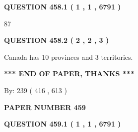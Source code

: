 \documentclass[12pt]{article}
\begin{document}
{\textbf{\Large{QUESTION
458.1 
 ( 1 , 1 , 6791 )
}}}
  
  
 
 
\noindent{}

87
 
 
  
\vspace{0.2in}
  
{\textbf{\Large{QUESTION
458.2 
 ( 2 , 2 , 3 )
}}}
  
  
 
 
\noindent{}
 
 
Canada has 10  provinces and 3 territories.
 
 
 
 
   
   
 \vspace{0.2in}
 
   
   
   
   
\vspace{1.0in} 
{\textbf{\large{ *** END OF PAPER, THANKS *** }}} 
   
   
\hspace{1.0in} By: 
 239 ( 416 ,  613 )
   
   
   
   
\newpage 
\setcounter{page}{ 
   459001 } 
   
   
   
   
 {\textbf{ \Large{ PAPER NUMBER  459  }}}
   
   
\vspace{0.2in}
   
   
   
   
   
   
 \vspace{0.2in}
 
 
 
 
   
   
  
\vspace{0.2in}
  
{\textbf{\Large{QUESTION
459.1 
 ( 1 , 1 , 6791 )
}}}
  
  
 
 
\noindent{}
\end{document}

